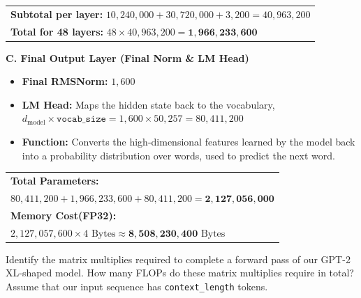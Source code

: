 \begin{answerbox}
    \begin{tabular}{@{}l@{}}
        \textbf{Subtotal per layer:} $10,240,000 + 30,720,000 + 3,200 = 40,963,200$ \\
        \textbf{Total for 48 layers:} $48 \times 40,963,200 = \mathbf{1,966,233,600}$
    \end{tabular}

    \vspace{1em}
    \textbf{C. Final Output Layer (Final Norm \& LM Head)}
    \begin{itemize}[itemsep=0.5em, parsep=0pt, topsep=0.5em]
        \item \textbf{Final RMSNorm:} $1,600$
        \item \textbf{LM Head:} Maps the hidden state back to the vocabulary, $d_{\mathrm{model}} \times \texttt{vocab\_size} = 1,600 \times 50,257 = 80,411,200$
        \item \textbf{Function:} Converts the high-dimensional features learned by the model back into a probability distribution over words, used to predict the next word.
    \end{itemize}

    \begin{tabular}{@{}l@{}}
        \textbf{Total Parameters:}                                         \\
        $80,411,200 + 1,966,233,600 + 80,411,200 = \mathbf{2,127,056,000}$ \\
        \textbf{Memory Cost(FP32):}                                        \\
        $2,127,057,600 \times 4 \text{ Bytes} \approx \mathbf{8,508,230,400} \text{ Bytes}$
    \end{tabular}

    \vspace{0.5em}
\end{answerbox}



\begin{questionbox}
    Identify the matrix multiplies required to complete a forward pass of our GPT-2 XL-shaped model. How many FLOPs do these matrix multiplies require in total? Assume that our input sequence has \texttt{context\_length} tokens.
\end{questionbox}


